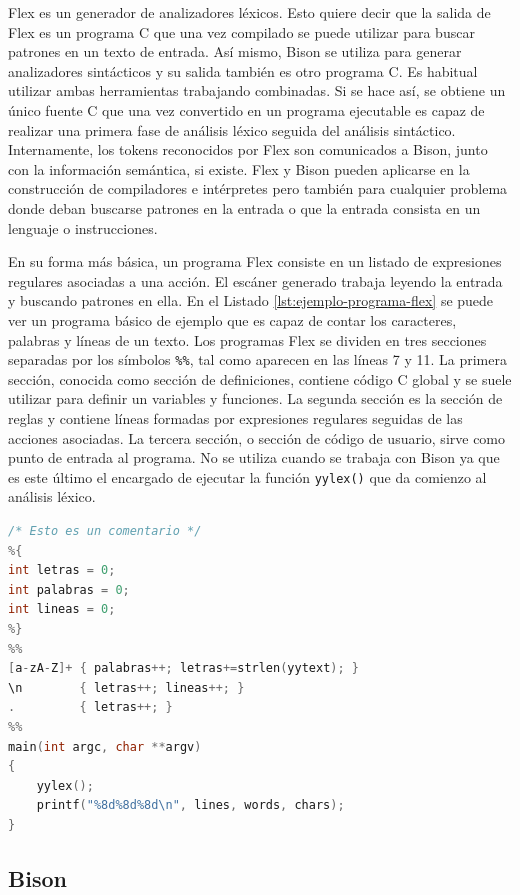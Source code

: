 Flex es un generador de analizadores léxicos. Esto quiere decir que la salida de Flex es un programa C que una vez compilado se puede utilizar para buscar patrones en un texto de entrada. Así mismo, Bison se utiliza para generar analizadores sintácticos y su salida también es otro programa C. Es habitual utilizar ambas herramientas trabajando combinadas. Si se hace así, se obtiene un único fuente C que una vez convertido en un programa ejecutable es capaz de realizar una primera fase de análisis léxico seguida del análisis sintáctico. Internamente, los tokens reconocidos por Flex son comunicados a Bison, junto con la información semántica, si existe. Flex y Bison pueden aplicarse en la construcción de compiladores e intérpretes pero también para cualquier problema donde deban buscarse patrones en la entrada o que la entrada consista en un lenguaje o instrucciones.

En su forma más básica, un programa Flex consiste en un listado de expresiones regulares asociadas a una acción. El escáner generado trabaja leyendo la entrada y buscando patrones en ella. En el Listado \ref{lst:ejemplo-programa-flex} se puede ver un programa básico de ejemplo que es capaz de contar los caracteres, palabras y líneas de un texto. Los programas Flex se dividen en tres secciones separadas por los símbolos \verb|%%|, tal como aparecen en las líneas 7 y 11. La primera sección, conocida como sección de definiciones, contiene código C global y se suele utilizar para definir un variables y funciones. La segunda sección es la sección de reglas y contiene líneas formadas por expresiones regulares seguidas de las acciones asociadas. La tercera sección, o sección de código de usuario, sirve como punto de entrada al programa. No se utiliza cuando se trabaja con Bison ya que es este último el encargado de ejecutar la función \verb|yylex()| que da comienzo al análisis léxico.

\begin{lstlisting}[language=C,caption={Ejemplo de programa Flex mínimo},label=lst:ejemplo-programa-flex]
/* Esto es un comentario */
%{
int letras = 0;
int palabras = 0;
int lineas = 0;
%}
%%
[a-zA-Z]+ { palabras++; letras+=strlen(yytext); }
\n        { letras++; lineas++; }
.         { letras++; }
%%
main(int argc, char **argv)
{
    yylex();
    printf("%8d%8d%8d\n", lines, words, chars);
}
\end{lstlisting}

\subsection{Bison}

